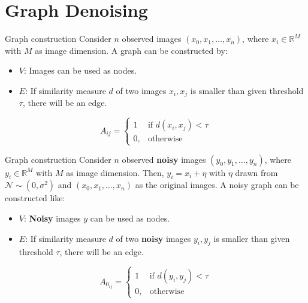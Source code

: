 \documentclass[aspectratio=169]{beamer}
\begin{document}
\section{Graph Denoising}

\begin{frame}{Graph construction}
    Consider $n$ observed images $(x_0, x_1, \dots, x_n)$, where $x_i \in \mathbb{R}^M$ with $M$ as image dimension.
    A graph can be constructed by:
    \begin{itemize}
        \item $V$: Images can be used as nodes.
        \item $E$: If similarity measure \textbf{$d$} of two images $x_i, x_j$ is smaller than given threshold \textbf{$\tau$}, there will be an edge.
     \end{itemize}

     \pause
     \begin{definition}
        \begin{equation}
            \label{eq:graphConstruction}
            A_{ij} =    
            \begin{cases}
                1  & \text{if } d(x_i, x_j) < \tau\\
                0, & \text{otherwise}
            \end{cases}
        \end{equation}
    \end{definition}
\end{frame}

\begin{frame}{Graph construction}
    Consider $n$ observed \textbf{noisy} images $(y_0, y_1, \dots, y_n)$, where $y_i \in \mathbb{R}^M$ with $M$ as image dimension.
    Then, $y_i = x_i + \eta$ with $\eta$ drawn from $\mathcal{N} \sim (0, \sigma^2)$ and $(x_0, x_1, \dots, x_n)$
    as the original images.
    A noisy graph can be constructed like:
    \begin{itemize}
        \item $V$: \textbf{Noisy} images $y$ can be used as nodes.
        \item $E$: If similarity measure $d$ of two \textbf{noisy} images $y_i, y_j$ is smaller than given threshold $\tau$, there will be an edge.
     \end{itemize}

     \pause

     \begin{definition}
        \begin{equation}
            \label{eq:graphConstructionNoise}
            A_{0_{ij}} =    
            \begin{cases}
                1  & \text{if } d(y_i, y_j) < \tau\\
                0, & \text{otherwise}
            \end{cases}
        \end{equation}    
     \end{definition}
\end{frame}
\end{document}
